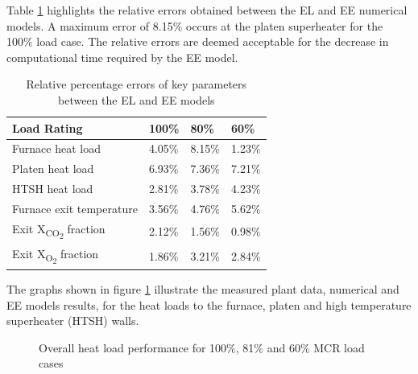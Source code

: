 \documentclass{webofc}
\begin{document}
Table \ref{tab_rel_err} highlights the relative errors obtained between the EL and EE numerical models. A maximum error of 8.15\% occurs at the platen superheater for the 100\% load case. The relative errors are deemed acceptable for the decrease in computational time required by the EE model.
\begin{table}[h!]
\centering
\caption{Relative percentage errors of key parameters between the EL and EE models}\label{tab_rel_err}       
\begin{tabular}{llll}
\hline
Load Rating & 100\% & 80\% & 60\%   \\
\hline
Furnace heat load & 4.05\% & 8.15\% & 1.23\%   \\
Platen heat load & 6.93\% & 7.36\% & 7.21\%   \\
HTSH heat load & 2.81\% & 3.78\% & 4.23\%  \\
Furnace exit temperature & 3.56\% & 4.76\% & 5.62\%  \\
Exit X\textsubscript{CO\textsubscript{2}} fraction & 2.12\% & 1.56\% & 0.98\% \\
Exit X\textsubscript{O\textsubscript{2}} fraction & 1.86\% &3.21\% & 2.84\%\\
\hline
\end{tabular}
\end{table}

The graphs shown in figure \ref{fig_heat_load} illustrate the measured plant data, numerical and EE models results,  for the heat loads to the furnace, platen and high temperature superheater (HTSH) walls.

\begin{figure}[h!]
\centering
{}
\hspace{5mm}
\hspace{5mm}
\setlength{\belowcaptionskip}{0pt}
\caption{Overall heat load performance for 100\%, 81\% and 60\% MCR load cases}
\label{fig_heat_load}
\end{figure}
\end{document}
